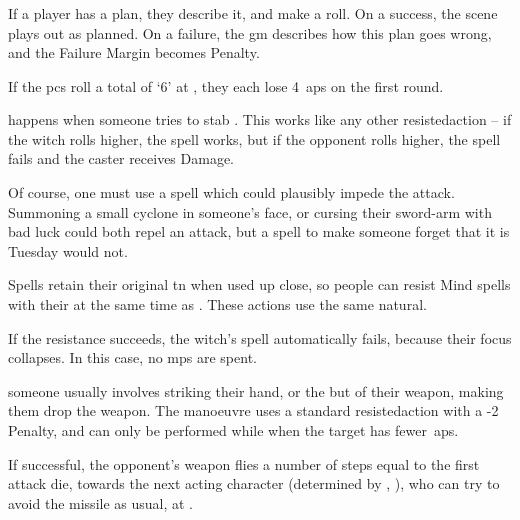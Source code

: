 \begin{multicols}{2}
\subsubsection{}

If a player has a plan, they describe it, and make a roll.
On a success, the scene plays out as planned.
On a failure, the \gls{gm} describes how this plan goes wrong, and the Failure Margin becomes  Penalty.

\begin{exampletext}
  If the \glspl{pc} roll a total of `6' at \tn[10], they each lose 4~\glspl{ap} on the first \gls{round}.
\end{exampletext}

happens when someone tries to stab .
This works like any other \gls{resistedaction} -- if the \gls{witch} rolls higher, the spell works, but if the opponent rolls higher, the spell fails and the caster receives Damage.

\columnbreak
{}

Of course, one must use a spell which could plausibly impede the attack.
Summoning a small cyclone in someone's face, or cursing their sword-arm with bad luck could both repel an attack, but a spell to make someone forget that it is Tuesday would not.

Spells retain their original \gls{tn} when used up close, so people can resist Mind spells with their  at the same time as .
These actions use the same \gls{natural}.

If the  resistance succeeds, the \gls{witch}'s spell automatically fails, because their focus collapses.
In this case, no \glspl{mp} are spent.

someone usually involves striking their hand, or the but of their weapon, making them drop the weapon.
The manoeuvre uses a standard  \gls{resistedaction} with a -2 Penalty, and can only be performed while when the target has fewer~\glspl{ap}.

If successful, the opponent's weapon flies a number of \glspl{step} equal to the first attack die, towards the next acting character (determined by , ), who can try to avoid the missile as usual, at \tn[12].


\end{multicols}
